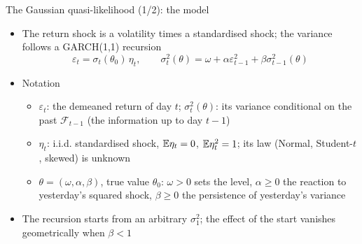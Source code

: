 \begin{frame}{The Gaussian quasi-likelihood (1/2): the model}
\itemsize{\small}
\begin{itemize}
    \item The return shock is a volatility times a standardised shock; the variance follows a GARCH(1,1) recursion
    \[ \varepsilon_t = \sigma_t(\theta_0)\,\eta_t, \qquad \sigma^2_t(\theta) = \omega + \alpha\varepsilon^2_{t-1} + \beta\sigma^2_{t-1}(\theta) \]
    \item Notation
    \begin{itemize}
        \item $\varepsilon_t$: the demeaned return of day $t$; $\sigma^2_t(\theta)$: its variance conditional on the past $\mathcal F_{t-1}$ (the information up to day $t-1$)
        \item $\eta_t$: i.i.d. standardised shock, $\mathbb{E}\eta_t = 0$, $\mathbb{E}\eta_t^2 = 1$; its law (Normal, Student-$t$, skewed) is unknown
        \item $\theta = (\omega, \alpha, \beta)$, true value $\theta_0$: $\omega > 0$ sets the level, $\alpha \ge 0$ the reaction to yesterday's squared shock, $\beta \ge 0$ the persistence of yesterday's variance
    \end{itemize}
    \item The recursion starts from an arbitrary $\sigma^2_1$; the effect of the start vanishes geometrically when $\beta < 1$
\end{itemize}
\end{frame}

